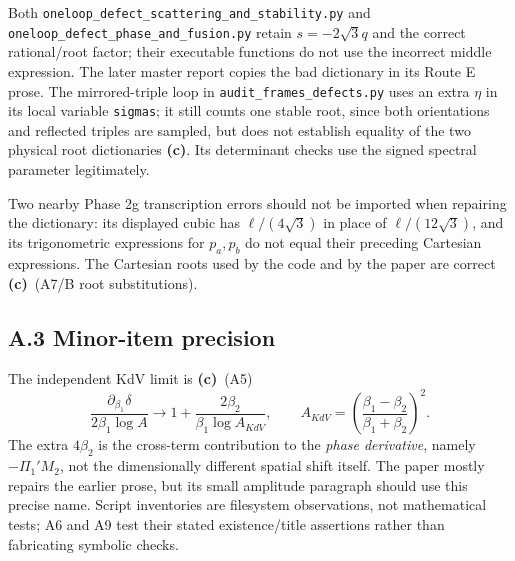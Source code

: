 \documentclass[11pt,a4paper]{article}
\newcommand{\C}{\textsf{\textbf{(c)}}}
\newcommand{\file}[1]{\nolinkurl{#1}}
\begin{document}
Both \file{oneloop_defect_scattering_and_stability.py} and
\file{oneloop_defect_phase_and_fusion.py} retain $s=-2\sqrt3q$ and the
correct rational/root factor; their executable functions do not use the
incorrect middle expression. The later master report copies the bad
dictionary in its Route E prose. The mirrored-triple loop in
\file{audit_frames_defects.py} uses an extra $\eta$ in its local variable
\file{sigmas}; it still counts one stable root, since both orientations and
reflected triples are sampled, but does not establish equality of the two
physical root dictionaries \C. Its determinant checks use the signed
spectral parameter legitimately.

Two nearby Phase 2g transcription errors should not be imported when repairing
the dictionary: its displayed cubic has $\ell/(4\sqrt3)$ in place of
$\ell/(12\sqrt3)$, and its trigonometric expressions for $p_a,p_b$ do not
equal their preceding Cartesian expressions. The Cartesian roots used by
the code and by the paper are correct \C\ (A7/B root substitutions).

\subsection*{A.3 Minor-item precision}
The independent KdV limit is \C\ (A5)
\[
 \frac{\partial_{\beta_1}\delta}{2\beta_1\log A}
 \longrightarrow 1+\frac{2\beta_2}{\beta_1\log A_{KdV}},
 \qquad A_{KdV}=\left(\frac{\beta_1-\beta_2}{\beta_1+\beta_2}\right)^2.
\]
The extra $4\beta_2$ is the cross-term contribution to the \emph{phase
derivative}, namely $-\Pi_1'M_2$, not the dimensionally different spatial
shift itself. The paper mostly repairs the earlier prose, but its small
amplitude paragraph should use this precise name. Script inventories are
filesystem observations, not mathematical tests; A6 and A9 test their stated
existence/title assertions rather than fabricating symbolic checks.
\end{document}
